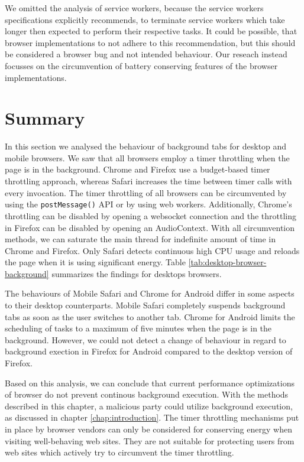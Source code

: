 \documentclass[
	ruledheaders=section,%
	class=report,%
	thesis={type=bachelor},%
	accentcolor=9c,%
	custommargins=true,%
	marginpar=false,%
	parskip=half-,%
	fontsize=11pt,%
]{tudapub}
\begin{document}
  We omitted the analysis of service workers, because the service workers specifications explicitly recommends, to terminate service workers which take longer then expected to perform their respective tasks. It could be possible, that browser implementations to not adhere to this recommendation, but this should be considered a browser bug and not intended behaviour. Our reseach instead focusses on the circumvention of battery conserving features of the browser implementations.


  
  \section{Summary}

  In this section we analysed the behaviour of background tabs for desktop and mobile browsers. We saw that all browsers employ a timer throttling when the page is in the background. Chrome and Firefox use a budget-based timer throttling approach, whereas Safari increases the time between timer calls with every invocation. The timer throttling of all browsers can be circumvented by using the \texttt{postMessage()} API or by using web workers. Additionally, Chrome's throttling can be disabled by opening a websocket connection and the throttling in Firefox can be disabled by opening an AudioContext. With all circumvention methods, we can saturate the main thread for indefinite amount of time in Chrome and Firefox. Only Safari detects continuous high CPU usage and reloads the page when it is using significant energy. Table \ref{tab:desktop-browser-background} summarizes the findings for desktops browsers.

    The behaviours of Mobile Safari and Chrome for Android differ in some aspects to their desktop counterparts. Mobile Safari completely suspends background tabs as soon as the user switches to another tab. Chrome for Android limits the scheduling of tasks to a maximum of five minutes when the page is in the background. However, we could not detect a change of behaviour in regard to background exection in Firefox for Android compared to the desktop version of Firefox.

    Based on this analysis, we can conclude that current performance optimizations of browser do not prevent continous background execution. With the methods described in this chapter, a malicious party could utilize background execution, as discussed in chapter \ref{chap:introduction}. The timer throttling mechanisms put in place by browser vendors can only be considered for conserving energy when visiting well-behaving web sites. They are not suitable for protecting users from web sites which actively try to circumvent the timer throttling.
\end{document}
